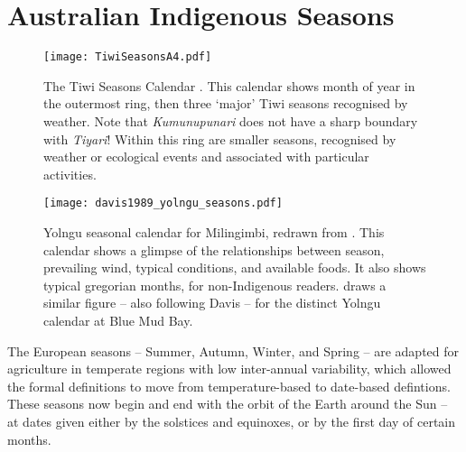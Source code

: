 \section{Australian Indigenous Seasons}
\label{sec:aus-indig-seasons}

\begin{sidewaysfigure}
    \vspace{0.3in}
    \centerline{ \texttt{[image: TiwiSeasonsA4.pdf]} }
    \caption[The Tiwi Seasons Calendar \citep{CSIROcals}]{
        The Tiwi Seasons Calendar \citep{CSIROcals}.
        This calendar shows month of year in the outermost ring,
        then three `major' Tiwi seasons recognised by weather.
        Note that \textit{Kumunupunari} does not have a sharp boundary with \textit{Tiyari}!
        Within this ring are smaller seasons, recognised by weather
        or ecological events and associated with particular activities.
        }
    \label{fig:tiwi-seasons}
\end{sidewaysfigure}

\begin{SCfigure}[][bth]
    \centering
    \texttt{[image: davis1989\_yolngu\_seasons.pdf]}
    \caption[Yolngu seasonal calendar for Milingimbi \citep{davis1989}]{
        Yolngu seasonal calendar for Milingimbi, redrawn from \citet[p2]{davis1989}.
        This calendar shows a glimpse of the relationships between season,
        prevailing wind, typical conditions, and available foods.
        It also shows typical gregorian months, for non-Indigenous readers.
        \citet[][p.107]{barber2005} draws a similar figure -- also following
        Davis -- for the distinct Yolngu calendar at Blue Mud Bay.
        }
    \label{fig:yolngu-seasons}
\end{SCfigure}


The European seasons -- Summer, Autumn, Winter, and Spring -- are adapted for
agriculture in temperate regions with low inter-annual variability, which
allowed the formal definitions to move from temperature-based to date-based
defintions.  These seasons now begin and end with the orbit of the Earth
around the Sun -- at dates given either by the solstices and equinoxes, or
by the first day of certain months.


